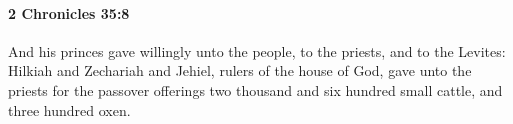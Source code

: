 
		\paragraph{2 Chronicles 35:8} %
			\label{2CHRONICLES-35-8}

			And his princes gave willingly unto the people, to the priests, and to the Levites: Hilkiah and Zechariah and Jehiel, rulers of the house of God, gave unto the priests for the passover offerings two thousand and six hundred small cattle, and three hundred oxen.


